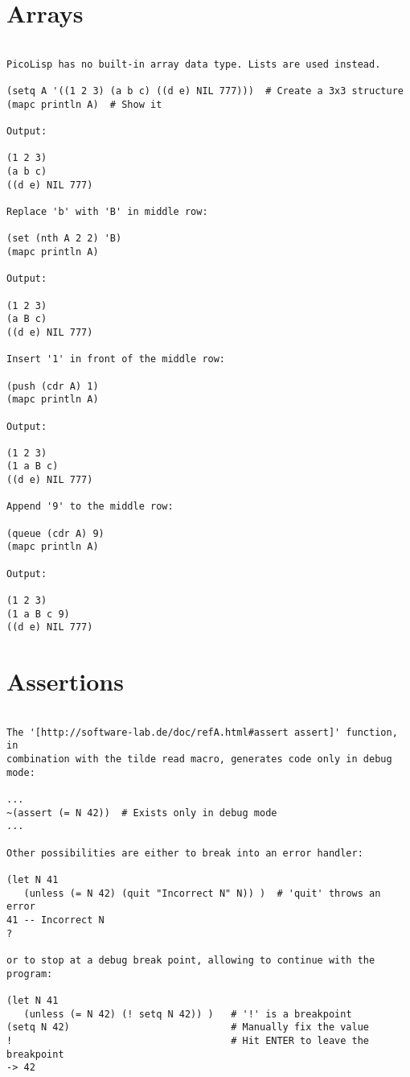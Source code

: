 \section*{Arrays}

\begin{verbatim}

PicoLisp has no built-in array data type. Lists are used instead.

(setq A '((1 2 3) (a b c) ((d e) NIL 777)))  # Create a 3x3 structure
(mapc println A)  # Show it

Output:

(1 2 3)
(a b c)
((d e) NIL 777)

Replace 'b' with 'B' in middle row:

(set (nth A 2 2) 'B)
(mapc println A)

Output:

(1 2 3)
(a B c)
((d e) NIL 777)

Insert '1' in front of the middle row:

(push (cdr A) 1)
(mapc println A)

Output:

(1 2 3)
(1 a B c)
((d e) NIL 777)

Append '9' to the middle row:

(queue (cdr A) 9)
(mapc println A)

Output:

(1 2 3)
(1 a B c 9)
((d e) NIL 777)

\end{verbatim}

\section*{Assertions}

\begin{verbatim}

The '[http://software-lab.de/doc/refA.html#assert assert]' function, in
combination with the tilde read macro, generates code only in debug mode:

...
~(assert (= N 42))  # Exists only in debug mode
...

Other possibilities are either to break into an error handler:

(let N 41
   (unless (= N 42) (quit "Incorrect N" N)) )  # 'quit' throws an error
41 -- Incorrect N
?

or to stop at a debug break point, allowing to continue with the program:

(let N 41
   (unless (= N 42) (! setq N 42)) )   # '!' is a breakpoint
(setq N 42)                            # Manually fix the value
!                                      # Hit ENTER to leave the breakpoint
-> 42

\end{verbatim}

